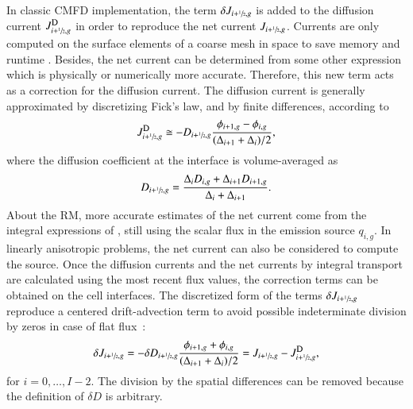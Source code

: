 In classic CMFD implementation, the term $\delta J_{i+\sfrac{1}{2},g}$ is added to the diffusion current $\jD_{i+\hzi,g}$ in order to reproduce the net current $J_{i+\sfrac{1}{2},g}$. Currents are only computed on the surface elements of a coarse mesh in space to save memory and runtime \cite{Smith-1983}. Besides, the net current can be determined from some other expression which is physically or numerically more accurate. Therefore, this new term acts as a correction for the diffusion current. The diffusion current is generally approximated by discretizing Fick's law, and by finite differences, according to
\begin{equation}
  \label{eq:JD}
  \jD_{i+\hzi,g} \cong - D_{i+\hzi,g}
    \frac{\phi_{i+1,g} - \phi_{i,g}}{(\Delta_{i+1} + \Delta_i)/2},
\end{equation}
where the diffusion coefficient at the interface is volume-averaged as
\begin{equation}
  \label{eq:Ds}
  D_{i+\sfrac{1}{2},g} = \frac{\Delta_i D_{i,g} + \Delta_{i+1} D_{i+1,g}}
{\Delta_i + \Delta_{i+1}}.
\end{equation}
%
About the RM, more accurate estimates of the net current come from the integral expressions of , still using the scalar flux in the emission source $q_{i,g}$. In linearly anisotropic problems, the net current can also be considered to compute the source. Once the diffusion currents and the net currents by integral transport are calculated using the most recent flux values, the correction terms can be obtained on the cell interfaces. The discretized form of the terms $\delta J_{i+\sfrac{1}{2},g}$ reproduce a centered drift-advection term to avoid possible indeterminate division by zeros in case of flat flux~\cite{Smith-1983,Tomatis-2011}:
\begin{equation}
  \label{eq:dJ}
  \delta J_{i+\hzi,g} = -\delta D_{i+\hzi,g}
    \frac{\phi_{i+1,g} + \phi_{i,g}}{(\Delta_{i+1} + \Delta_i)/2} =
  J_{i+\hzi,g} - \jD_{i+\hzi,g},
\end{equation}
for $i = 0, \ldots, I-2$. The division by the spatial differences can be removed because the definition of $\delta D$ is arbitrary.

